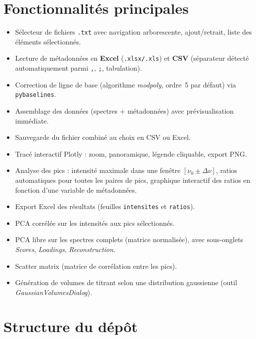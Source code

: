\documentclass[12pt, a4paper]{article}
\begin{document}
\section{Fonctionnalités principales}

\begin{itemize}
  \item Sélecteur de fichiers \texttt{.txt} avec navigation arborescente,
        ajout/retrait, liste des éléments sélectionnés.
  \item Lecture de métadonnées en \textbf{Excel} (\texttt{.xlsx/.xls}) et
        \textbf{CSV} (séparateur détecté automatiquement parmi \texttt{,},
        \texttt{;}, tabulation).
  \item Correction de ligne de base (algorithme \textit{modpoly}, ordre~5 par
        défaut) via \texttt{pybaselines}.
  \item Assemblage des données (spectres + métadonnées) avec prévisualisation
        immédiate.
  \item Sauvegarde du fichier combiné au choix en CSV ou Excel.
  \item Tracé interactif Plotly : zoom, panoramique, légende cliquable,
        export PNG.
  \item Analyse des pics : intensité maximale dans une fenêtre
        $[\nu_0 \pm \Delta\nu]$, ratios automatiques pour toutes les paires
        de pics, graphique interactif des ratios en fonction d'une variable
        de métadonnées.
  \item Export Excel des résultats (feuilles \texttt{intensites} et
        \texttt{ratios}).
  \item PCA corrélée sur les intensités aux pics sélectionnés.
  \item PCA libre sur les spectres complets (matrice normalisée), avec
        sous-onglets \textit{Scores}, \textit{Loadings}, \textit{Reconstruction}.
  \item Scatter matrix (matrice de corrélation entre les pics).
  \item Génération de volumes de titrant selon une distribution gaussienne
        (outil \textit{GaussianVolumesDialog}).
\end{itemize}

\section{Structure du dépôt}
\end{document}
